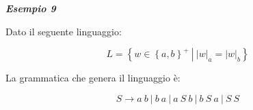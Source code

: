 \documentclass[a4paper]{article}
\begin{document}
	\noindent
	\textcolor{Green4}{\textbf{\emph{Esempio 9}}}
	
	\noindent
	Dato il seguente linguaggio:
	
	\begin{equation*}
		L = \left\{w \in \left\{a,b\right\}^{+} \: \left| \: |w|_{a} = |w|_{b} \right.\right\}
	\end{equation*}

	\noindent
	La grammatica che genera il linguaggio è:
	
	\begin{equation*}
		S \longrightarrow a \: b \: | \: b \: a \: | \: a \: S \: b \: | \: b \: S \: a \: | \: S \: S
	\end{equation*}
\end{document}
